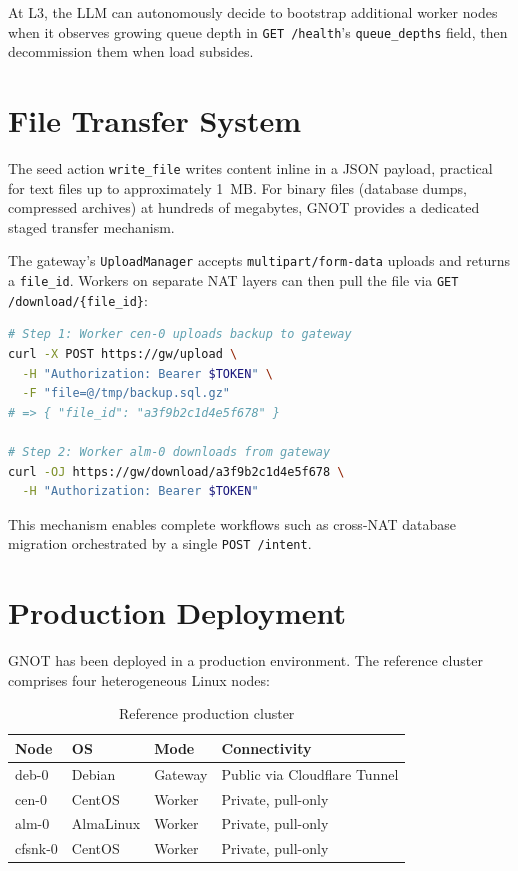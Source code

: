\documentclass[10pt,twocolumn]{article}
\begin{document}
At L3, the LLM can autonomously decide to bootstrap additional worker
nodes when it observes growing queue depth in \texttt{GET /health}'s
\texttt{queue\_depths} field, then decommission them when load subsides.

\FloatBarrier
\section{File Transfer System}
\label{sec:files}

The seed action \texttt{write\_file} writes content inline in a JSON
payload, practical for text files up to approximately 1~MB. For binary
files (database dumps, compressed archives) at hundreds of megabytes,
GNOT provides a dedicated staged transfer mechanism.

The gateway's \texttt{UploadManager} accepts \texttt{multipart/form-data}
uploads and returns a \texttt{file\_id}. Workers on separate NAT layers
can then pull the file via \texttt{GET /download/\{file\_id\}}:

\begin{lstlisting}[language=bash, caption={Cross-NAT binary file transfer}]
# Step 1: Worker cen-0 uploads backup to gateway
curl -X POST https://gw/upload \
  -H "Authorization: Bearer $TOKEN" \
  -F "file=@/tmp/backup.sql.gz"
# => { "file_id": "a3f9b2c1d4e5f678" }

# Step 2: Worker alm-0 downloads from gateway
curl -OJ https://gw/download/a3f9b2c1d4e5f678 \
  -H "Authorization: Bearer $TOKEN"
\end{lstlisting}

This mechanism enables complete workflows such as cross-NAT database
migration orchestrated by a single \texttt{POST /intent}.

\FloatBarrier
\section{Production Deployment}
\label{sec:deployment}

GNOT has been deployed in a production environment. The reference cluster
comprises four heterogeneous Linux nodes:

\begin{table}[tp]
\centering
\caption{Reference production cluster}
\label{tab:cluster}
\small
\begin{tabular}{@{}lllp{2.8cm}@{}}
\toprule
\textbf{Node} & \textbf{OS} & \textbf{Mode} & \textbf{Connectivity} \\
\midrule
deb-0 & Debian & Gateway & Public via Cloudflare Tunnel \\
cen-0 & CentOS & Worker & Private, pull-only \\
alm-0 & AlmaLinux & Worker & Private, pull-only \\
cfsnk-0 & CentOS & Worker & Private, pull-only \\
\bottomrule
\end{tabular}
\end{table}
\end{document}
